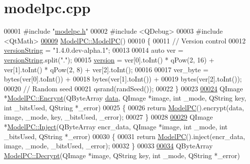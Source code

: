 \hypertarget{modelpc_8cpp_source}{\section{modelpc.\-cpp}
}

\begin{DoxyCode}
00001 \textcolor{preprocessor}{#include "\hyperlink{modelpc_8h}{modelpc.h}"}
00002 \textcolor{preprocessor}{#include <QDebug>}
00003 \textcolor{preprocessor}{#include <QtMath>}
\hypertarget{modelpc_8cpp_source_l00009}{}\hyperlink{class_model_p_c_ae12ebe65ec973c02a0de4850a7c1e31c}{00009} \hyperlink{class_model_p_c_ae12ebe65ec973c02a0de4850a7c1e31c}{ModelPC::ModelPC}()
00010 \{
00011     \textcolor{comment}{// Version control}
00012     \hyperlink{class_model_p_c_a5f426725ccf7eefd3c77ea8c720264c9}{versionString} = \textcolor{stringliteral}{"1.4.0.dev-alpha.1"};
00013 
00014     \textcolor{keyword}{auto} ver = \hyperlink{class_model_p_c_a5f426725ccf7eefd3c77ea8c720264c9}{versionString}.split(\textcolor{stringliteral}{"."});
00015     \hyperlink{class_model_p_c_a5af48ab89e19be42a94c34ba00249401}{version} = ver[0].toInt() * qPow(2, 16) + ver[1].toInt() * qPow(2, 8) + ver[2].toInt();
00016 
00017     ver\_byte = bytes(ver[0].toInt()) +
00018             bytes(ver[1].toInt()) +
00019             bytes(ver[2].toInt());
00020     \textcolor{comment}{// Random seed}
00021     qsrand(randSeed());
00022 \}
00023 
\hypertarget{modelpc_8cpp_source_l00024}{}\hyperlink{class_model_p_c_a271cf9285e32df58ffbfc918e6482bbd}{00024} QImage *\hyperlink{class_model_p_c_a271cf9285e32df58ffbfc918e6482bbd}{ModelPC::Encrypt}(QByteArray \hyperlink{namespace_errors_dict_setup_adf4c30d205d29df7343e26f7c62b0685}{data}, QImage *image, \textcolor{keywordtype}{int} \_mode, QString key, \textcolor{keywordtype}{int} 
      \_bitsUsed, QString *\_error)
00025 \{
00026     \textcolor{keywordflow}{return} \hyperlink{class_model_p_c_ae12ebe65ec973c02a0de4850a7c1e31c}{ModelPC}().encrypt(data, image, \_mode, key, \_bitsUsed, \_error);
00027 \}
00028 
\hypertarget{modelpc_8cpp_source_l00029}{}\hyperlink{class_model_p_c_ac17e68e6aab134621b0d151d74acdc82}{00029} QImage *\hyperlink{class_model_p_c_ac17e68e6aab134621b0d151d74acdc82}{ModelPC::Inject}(QByteArray encr\_data, QImage *image, \textcolor{keywordtype}{int} \_mode, \textcolor{keywordtype}{int} \_bitsUsed, 
      QString *\_error)
00030 \{
00031     \textcolor{keywordflow}{return} \hyperlink{class_model_p_c_ae12ebe65ec973c02a0de4850a7c1e31c}{ModelPC}().inject(encr\_data, image, \_mode, \_bitsUsed, \_error);
00032 \}
00033 
\hypertarget{modelpc_8cpp_source_l00034}{}\hyperlink{class_model_p_c_a902abaea4f07995b48c0f2fea6eceb7c}{00034} QByteArray \hyperlink{class_model_p_c_a902abaea4f07995b48c0f2fea6eceb7c}{ModelPC::Decrypt}(QImage *image, QString key, \textcolor{keywordtype}{int} \_mode, QString *\_error)

\end{DoxyCode}
